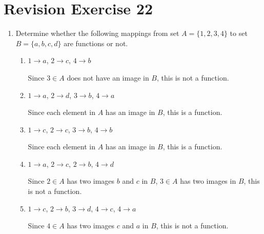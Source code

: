 \documentclass[12pt]{report}
\begin{document}
\singlespacing{}

\doublespacing{}
\tableofcontents
\singlespacing{}
\newpage

\onehalfspacing

\section*{Revision Exercise 22}

\begin{enumerate}
    \item Determine whether the following mappings from set $A = \{1, 2, 3, 4\}$ to set
          $B = \{a, b, c, d\}$ are functions or not.
          \begin{enumerate}
              \item $1 \to a$, $2 \to c$, $4 \to b$
                    \sol{}

                    Since $3 \in A$ does not have an image in $B$, this is not a function.

              \item $1 \to a$, $2 \to d$, $3 \to b$, $4 \to a$
                    \sol{}

                    Since each element in $A$ has an image in $B$, this is a function.

              \item $1 \to c$, $2 \to c$, $3 \to b$, $4 \to b$
                    \sol{}

                    Since each element in $A$ has an image in $B$, this is a function.

              \item $1 \to a$, $2 \to c$, $2 \to b$, $4 \to d$
                    \sol{}

                    Since $2 \in A$ has two images $b$ and $c$ in $B$, $3 \in A$ has two images in
                    $B$, this is not a function.

              \item $1 \to c$, $2 \to b$, $3 \to d$, $4 \to c$, $4 \to a$
                    \sol{}

                    Since $4 \in A$ has two images $c$ and $a$ in $B$, this is not a function.
          \end{enumerate}


\end{enumerate}
\end{document}
